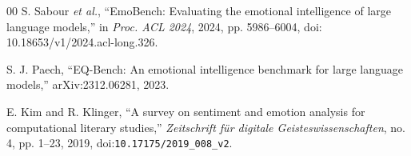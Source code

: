 \documentclass[conference]{IEEEtran}
\begin{document}
\begin{thebibliography}{00}
S. Sabour \emph{et al.}, ``EmoBench: Evaluating the emotional intelligence of large language models,'' in \emph{Proc. ACL 2024}, 2024, pp. 5986--6004, doi: 10.18653/v1/2024.acl-long.326.

S. J. Paech, ``EQ-Bench: An emotional intelligence benchmark for large language models,'' arXiv:2312.06281, 2023.

E. Kim and R. Klinger, ``A survey on sentiment and emotion analysis for computational literary studies,'' \emph{Zeitschrift f\"ur digitale Geisteswissenschaften}, no. 4, pp. 1--23, 2019, doi:\texttt{10.17175/2019\_008\_v2}.

\end{thebibliography}
\end{document}

